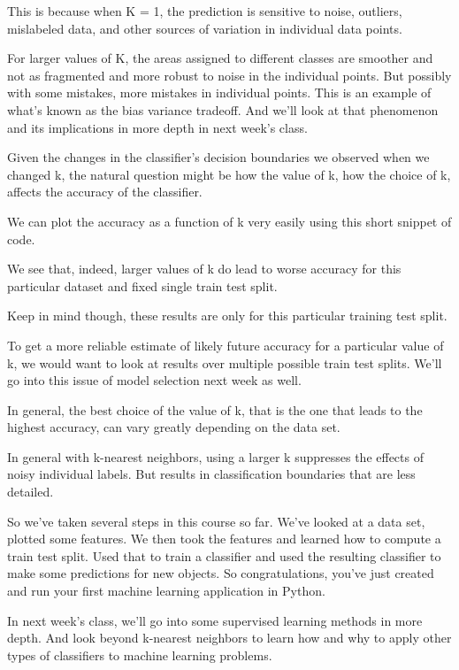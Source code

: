 \begin{multicols}{2}
This is because when K = 1, the prediction is sensitive to noise, outliers, mislabeled data, and other sources of variation in individual data points. 

For larger values of K, the areas assigned to different classes are smoother and not as fragmented and more robust to noise in the individual points. But possibly with some mistakes, more mistakes in individual points. This is an example of what's known as the bias variance tradeoff. And we'll look at that phenomenon and its implications in more depth in next week's class. 

Given the changes in the classifier's decision boundaries we observed when we changed k, the natural question might be how the value of k, how the choice of k, affects the accuracy of the classifier. 

We can plot the accuracy as a function of k very easily using this short snippet of code. 

We see that, indeed, larger values of k do lead to worse accuracy for this particular dataset and fixed single train test split. 

Keep in mind though, these results are only for this particular training test split. 

To get a more reliable estimate of likely future accuracy for a particular value of k, we would want to look at results over multiple possible train test splits. We'll go into this issue of model selection next week as well. 

In general, the best choice of the value of k, that is the one that leads to the highest accuracy, can vary greatly depending on the data set. 

In general with k-nearest neighbors, using a larger k suppresses the effects of noisy individual labels. But results in classification boundaries that are less detailed. 

So we've taken several steps in this course so far. We've looked at a data set, plotted some features. We then took the features and learned how to compute a train test split. Used that to train a classifier and used the resulting classifier to make some predictions for new objects. So congratulations, you've just created and run your first machine learning application in Python. 

In next week's class, we'll go into some supervised learning methods in more depth. And look beyond k-nearest neighbors to learn how and why to apply other types of classifiers to machine learning problems. 

\end{multicols}